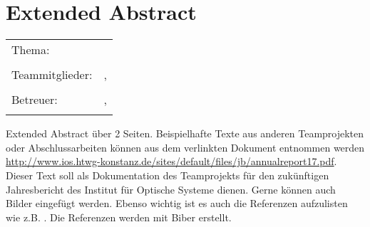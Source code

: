 \chapter*{Extended Abstract}

\begin{center}
	\begingroup
	\renewcommand*{\arraystretch}{1}
	{\makeatletter	
		\begin{tabular}{p{3.2cm}p{9.6cm}}
			Thema: & \thema \\
			& \\
			Teammitglieder: & \verfasserA, \verfasserB 
			\verfasserC \verfasserD\\
			& \\
			Betreuer: & \hoschschule \newline \institut \newline \prueferA, \prueferB \\
			& \\
		\end{tabular}
		
		\makeatother}
	\endgroup
\end{center}

\bigskip

\noindent
Extended Abstract über 2 Seiten. Beispielhafte Texte aus anderen Teamprojekten oder Abschlussarbeiten können aus dem verlinkten Dokument entnommen werden \href{http://www.ios.htwg-konstanz.de/sites/default/files/jb/annualreport17.pdf}{http://www.ios.htwg-konstanz.de/sites/default/files/jb/annualreport17.pdf}.\\

\noindent Dieser Text soll als Dokumentation des Teamprojekts für den zukünftigen Jahresbericht des Institut für Optische Systeme dienen. Gerne können auch Bilder eingefügt werden. Ebenso wichtig ist es auch die Referenzen aufzulisten wie z.B. \cite{Geim2001}. Die Referenzen werden mit Biber erstellt.


\printbibliography[title={Referenzen}, heading=subbibliography]

